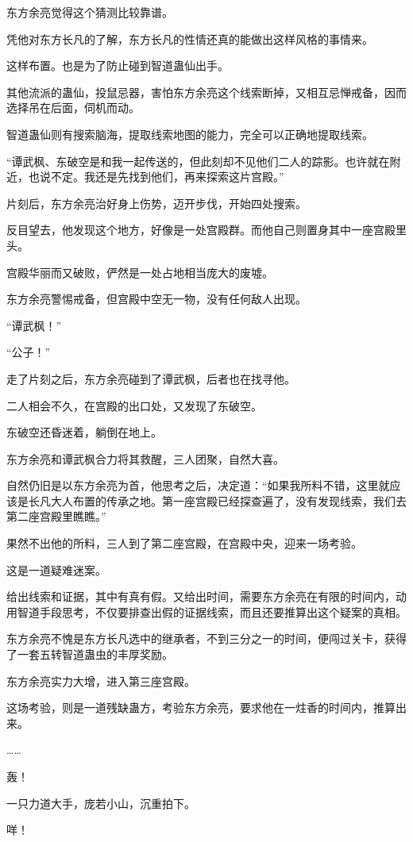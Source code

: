 \begin{this_body}
东方余亮觉得这个猜测比较靠谱。

凭他对东方长凡的了解，东方长凡的性情还真的能做出这样风格的事情来。

这样布置。也是为了防止碰到智道蛊仙出手。

其他流派的蛊仙，投鼠忌器，害怕东方余亮这个线索断掉，又相互忌惮戒备，因而选择吊在后面，伺机而动。

智道蛊仙则有搜索脑海，提取线索地图的能力，完全可以正确地提取线索。

“谭武枫、东破空是和我一起传送的，但此刻却不见他们二人的踪影。也许就在附近，也说不定。我还是先找到他们，再来探索这片宫殿。”

片刻后，东方余亮治好身上伤势，迈开步伐，开始四处搜索。

反目望去，他发现这个地方，好像是一处宫殿群。而他自己则置身其中一座宫殿里头。

宫殿华丽而又破败，俨然是一处占地相当庞大的废墟。

东方余亮警惕戒备，但宫殿中空无一物，没有任何敌人出现。

“谭武枫！”

“公子！”

走了片刻之后，东方余亮碰到了谭武枫，后者也在找寻他。

二人相会不久，在宫殿的出口处，又发现了东破空。

东破空还昏迷着，躺倒在地上。

东方余亮和谭武枫合力将其救醒，三人团聚，自然大喜。

自然仍旧是以东方余亮为首，他思考之后，决定道：“如果我所料不错，这里就应该是长凡大人布置的传承之地。第一座宫殿已经探查遍了，没有发现线索，我们去第二座宫殿里瞧瞧。”

果然不出他的所料，三人到了第二座宫殿，在宫殿中央，迎来一场考验。

这是一道疑难迷案。

给出线索和证据，其中有真有假。又给出时间，需要东方余亮在有限的时间内，动用智道手段思考，不仅要排查出假的证据线索，而且还要推算出这个疑案的真相。

东方余亮不愧是东方长凡选中的继承者，不到三分之一的时间，便闯过关卡，获得了一套五转智道蛊虫的丰厚奖励。

东方余亮实力大增，进入第三座宫殿。

这场考验，则是一道残缺蛊方，考验东方余亮，要求他在一炷香的时间内，推算出来。

……

轰！

一只力道大手，庞若小山，沉重拍下。

咩！


\end{this_body}
